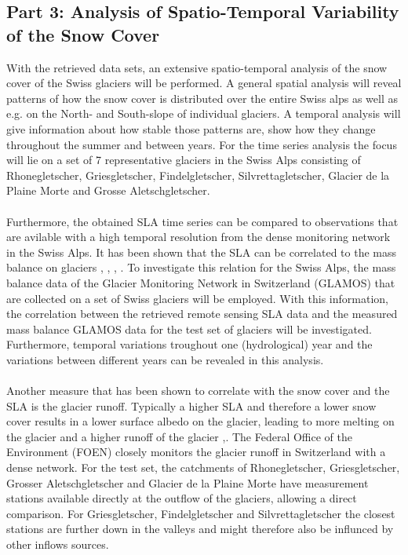 \documentclass[12pt]{article}
\begin{document}
\subsection{Part 3: Analysis of Spatio-Temporal Variability of the Snow Cover}
With the retrieved data sets, an extensive spatio-temporal analysis of the snow cover of the Swiss glaciers will be performed. A general spatial analysis will reveal patterns of how the snow cover is distributed over the entire Swiss alps as well as e.g. on the North- and South-slope of individual glaciers.  A temporal analysis will give information about how stable those patterns are, show how they change throughout the summer and between years. For the time series analysis the focus will lie on a set of 7 representative glaciers in the Swiss Alps consisting of Rhonegletscher, Griesgletscher, Findelgletscher, Silvrettagletscher, Glacier de la Plaine Morte and Grosse Aletschgletscher.\\
\\
Furthermore, the obtained SLA time series can be compared to observations that are avilable with a high temporal resolution from the dense monitoring network in the Swiss Alps. It has been shown that the SLA can be correlated to the mass balance on glaciers \cite{Oestrem1973}, \cite{Young1981}, \cite{Hock2007}, \cite{Barandun2018}. 
To investigate this relation for the Swiss Alps, the mass balance data of the Glacier Monitoring Network in Switzerland (GLAMOS) that are collected on a set of Swiss glaciers will be employed. With this information, the correlation between the retrieved remote sensing SLA data and the measured mass balance GLAMOS data for the test set of glaciers will be investigated. Furthermore, temporal variations troughout one (hydrological) year and the variations between different years can be revealed in this analysis. \\
\\
Another measure that has been shown to correlate with the snow cover and the SLA is the glacier runoff. Typically a higher SLA and therefore a lower snow cover results in a lower surface albedo on the glacier, leading to more melting on the glacier and a higher runoff of the glacier \cite{Konovalov1994},\cite{Engelhardt2014}. The Federal Office of the Environment (FOEN) closely monitors the glacier runoff in Switzerland with a dense network. For the test set, the catchments of Rhonegletscher, Griesgletscher, Grosser Aletschgletscher and Glacier de la Plaine Morte have measurement stations available directly at the outflow of the glaciers, allowing a direct comparison. For Griesgletscher, Findelgletscher and Silvrettagletscher the closest stations are further down in the valleys and might therefore also be influnced by other inflows sources. 
\end{document}
